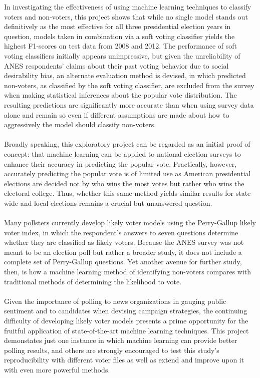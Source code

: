 \documentclass{article}
\begin{document}
	In investigating the effectiveness of using machine learning techniques to classify voters and non-voters, this project shows that while no single model stands out definitively as the most effective for all three presidential election years in question, models taken in combination via a soft voting classifier yields the highest F1-scores on test data from 2008 and 2012. The performance of soft voting classifiers initially appears unimpressive, but given the unreliability of ANES respondents' claims about their past voting behavior due to social desirability bias, an alternate evaluation method is devised, in which predicted non-voters, as classified by the soft voting classifier, are excluded from the survey when making statistical inferences about the popular vote distribution. The resulting predictions are significantly more accurate than when using survey data alone and remain so even if different assumptions are made about how to aggressively the model should classify non-voters.
	\\\\
	Broadly speaking, this exploratory project can be regarded as an initial proof of concept: that machine learning can be applied to national election surveys to enhance their accuracy in predicting the popular vote. Practically, however, accurately predicting the popular vote is of limited use as American presidential elections are decided not by who wins the most votes but rather who wins the electoral college. Thus, whether this same method yields similar results for state-wide and local elections remains a crucial but unanswered question.
	\\\\
	Many pollsters currently develop likely voter models using the Perry-Gallup likely voter index, in which the respondent's answers to seven questions determine whether they are classified as likely voters. Because the ANES survey was not meant to be an election poll but rather a broader study, it does not include a complete set of Perry-Gallup questions. Yet another avenue for further study, then, is how a machine learning method of identifying non-voters compares with traditional methods of determining the likelihood to vote.
	\\\\
	Given the importance of polling to news organizations in gauging public sentiment and to candidates when devising campaign strategies, the continuing difficulty of developing likely voter models presents a prime opportunity for the fruitful application of state-of-the-art machine learning techniques. This project demonstates just one instance in which machine learning can provide better polling results, and others are strongly encouraged to test this study's reproducibility with different voter files as well as extend and improve upon it with even more powerful methods.
	
\end{document}
